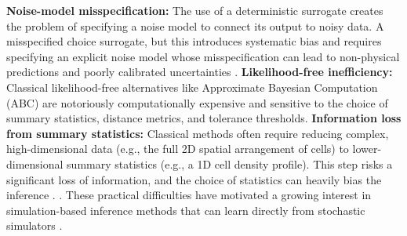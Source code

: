 \documentclass{article}
\providecommand{\DIFaddtex}[1]{{\protect\color{blue} \sf #1}} %
\providecommand{\DIFdeltex}[1]{{\protect\color{red} \scriptsize #1}} %
\providecommand{\DIFaddbegin}{} %
\providecommand{\DIFaddend}{} %
\providecommand{\DIFdelbegin}{} %
\providecommand{\DIFdelend}{} %
\providecommand{\DIFadd}[1]{\texorpdfstring{\DIFaddtex{#1}}{#1}} %
\providecommand{\DIFdel}[1]{\texorpdfstring{\DIFdeltex{#1}}{}} %
\newcommand{\DIFscaledelfig}{0.5}
\newlength{\DIFdelgraphicswidth} %
\newlength{\DIFdelgraphicsheight} %
\newcommand{\DIFaddincludegraphics}[2][]{{\color{blue}\fbox{\DIFOincludegraphics[#1]{#2}}}} %
\newcommand{\DIFdelincludegraphics}[2][]{%
\sbox{\DIFdelgraphicsbox}{\DIFOincludegraphics[#1]{#2}}%
\settoboxwidth{\DIFdelgraphicswidth}{\DIFdelgraphicsbox} %
\settoboxtotalheight{\DIFdelgraphicsheight}{\DIFdelgraphicsbox} %
\scalebox{\DIFscaledelfig}{%
\parbox[b]{\DIFdelgraphicswidth}{\usebox{\DIFdelgraphicsbox}\\[-\baselineskip] \rule{\DIFdelgraphicswidth}{0em}}\llap{\resizebox{\DIFdelgraphicswidth}{\DIFdelgraphicsheight}{%
\setlength{\unitlength}{\DIFdelgraphicswidth}%
\begin{picture}(1,1)%
\thicklines\linethickness{2pt} %
{\color[rgb]{1,0,0}\put(0,0){\framebox(1,1){}}}%
{\color[rgb]{1,0,0}\put(0,0){\line( 1,1){1}}}%
{\color[rgb]{1,0,0}\put(0,1){\line(1,-1){1}}}%
\end{picture}%
}\hspace*{3pt}}} %
} %
\DeclareRobustCommand{\DIFaddbegin}{\DIFOaddbegin \let\includegraphics\DIFaddincludegraphics} %
\DeclareRobustCommand{\DIFaddend}{\DIFOaddend \let\includegraphics\DIFOincludegraphics} %
\DeclareRobustCommand{\DIFdelbegin}{\DIFOdelbegin \let\includegraphics\DIFdelincludegraphics} %
\DeclareRobustCommand{\DIFdelend}{\DIFOaddend \let\includegraphics\DIFOincludegraphics} %
\begin{document}
\DIFdel{\textbf{Noise-model misspecification:} The use of a deterministic surrogate creates the problem of specifying a noise model to connect its output to noisy data. A misspecified choice }\DIFdelend \DIFaddbegin \DIFadd{surrogate, but this introduces systematic bias and requires specifying an explicit noise model whose misspecification }\DIFaddend can lead to \DIFdelbegin \DIFdel{non-physical predictions and }\DIFdelend poorly calibrated uncertainties \DIFdelbegin \DIFdel{. 
	}%
\DIFdel{\textbf{Likelihood-free inefficiency:} Classical likelihood-free alternatives like Approximate Bayesian Computation (ABC) are notoriously computationally expensive and sensitive to the choice of summary statistics, distance metrics, and tolerance thresholds.
	}%
\DIFdel{\textbf{Information loss from summary statistics:} Classical methods often require reducing complex, high-dimensional data (e.g., the full 2D spatial arrangement of cells) to lower-dimensional summary statistics (e.g., a 1D cell density profile). This step risks a significant loss of information, and the choice of statistics can heavily bias the inference . 
	 }%
\DIFdelend \DIFaddbegin \DIFadd{\citep{KennedyOHagan2001,BrynjarsdottirOHagan2014,SIMPSON2024111732}. These practical difficulties have motivated a growing interest in simulation-based inference methods that can learn directly from stochastic simulators \citep{Carr2021,SIMPSON2022111201,Simpson2025.05.25.656057,Ross2017ABCadhesion,Warne2022RapidBayes,Liu2024PRE}.
}\DIFaddend 
\end{document}
